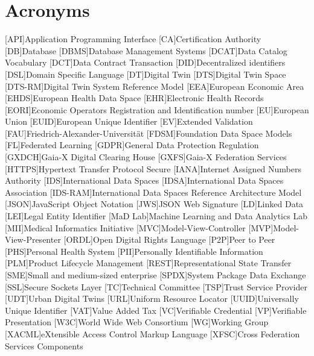 \chapter{Acronyms}
\begin{acronym}
    [API]{Application Programming Interface}
    [CA]{Certification Authority}
    [DB]{Database}
    [DBMS]{Database Management Systems}
    [DCAT]{Data Catalog Vocabulary}
    [DCT]{Data Contract Transaction}
    [DID]{Decentralized identifiers}
    [DSL]{Domain Specific Language}
    [DT]{Digital Twin}
    [DTS]{Digital Twin Space}
    [DTS-RM]{Digital Twin System Reference Model}
    [EEA]{European Economic Area}
    [EHDS]{European Health Data Space}
    [EHR]{Electronic Health Records}
    [EORI]{Economic Operators Registration and Identification number}
    [EU]{European Union}
    [EUID]{European Unique Identifier}
    [EV]{Extended Validation}
    [FAU]{Friedrich-Alexander-Universität}
    [FDSM]{Foundation Data Space Models}
    [FL]{Federated Learning}
    [GDPR]{General Data Protection Regulation}
    [GXDCH]{Gaia-X Digital Clearing House}
    [GXFS]{Gaia-X Federation Services} %
    [HTTPS]{Hypertext Transfer Protocol Secure}
    [IANA]{Internet Assigned Numbers Authority}
    [IDS]{International Data Spaces}
    [IDSA]{International Data Spaces Association}
    [IDS-RAM]{International Data Spaces Reference Architecture Model}
    [JSON]{JavaScript Object Notation}
    [JWS]{JSON Web Signature}
    [LD]{Linked Data}
    [LEI]{Legal Entity Identifier}
    [MaD Lab]{Machine Learning and Data Analytics Lab}
    [MII]{Medical Informatics Initiative}
    [MVC]{Model-View-Controller}
    [MVP]{Model-View-Presenter}
    [ORDL]{Open Digital Rights Language}
    [P2P]{Peer to Peer}
    [PHS]{Personal Health System}
    [PII]{Personally Identifiable Information}
    [PLM]{Product Lifecycle Management}
    [REST]{Representational State Transfer}
    [SME]{Small and medium-sized enterprise}
    [SPDX]{System Package Data Exchange}
    [SSL]{Secure Sockets Layer}
    [TC]{Technical Committee}
    [TSP]{Trust Service Provider}
    [UDT]{Urban Digital Twins}
    [URL]{Uniform Resource Locator}
    [UUID]{Universally Unique Identifier}
    [VAT]{Value Added Tax}
    [VC]{Verifiable Credential}
    [VP]{Verifiable Presentation}
    [W3C]{World Wide Web Consortium}
    [WG]{Working Group}
    [XACML]{eXtensible Access Control Markup Language}
    [XFSC]{Cross Federation Services Components}
\end{acronym}
